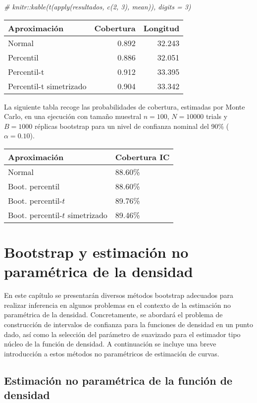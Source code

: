 \documentclass[
]{book}
\newenvironment{Shaded}{\begin{snugshade}}{\end{snugshade}}
\newcommand{\CommentTok}[1]{\textcolor[rgb]{0.56,0.35,0.01}{\textit{#1}}}
\theoremstyle{definition}
\theoremstyle{definition}
\theoremstyle{definition}
\theoremstyle{remark}
\begin{document}
\begin{Shaded}
\begin{Highlighting}[]
\CommentTok{# knitr::kable(t(apply(resultados, c(2, 3), mean)), digits = 3)}
\end{Highlighting}
\end{Shaded}

\begin{longtable}[]{@{}lrr@{}}
\toprule
Aproximación & Cobertura & Longitud\tabularnewline
\midrule
\endhead
Normal & 0.892 & 32.243\tabularnewline
Percentil & 0.886 & 32.051\tabularnewline
Percentil-t & 0.912 & 33.395\tabularnewline
Percentil-t simetrizado & 0.904 & 33.342\tabularnewline
\bottomrule
\end{longtable}

La siguiente tabla recoge las probabilidades de cobertura, estimadas por
Monte Carlo, en una ejecución con tamaño muestral \(n=100\), \(N=10000\)
trials y \(B=1000\) réplicas bootstrap para un nivel de confianza nominal
del 90\% (\(\alpha =0.10\)).

\begin{longtable}[]{@{}ll@{}}
\toprule
Aproximación & Cobertura IC\tabularnewline
\midrule
\endhead
Normal & 88.60\%\tabularnewline
Boot. percentil & 88.60\%\tabularnewline
Boot. percentil-\(t\) & 89.76\%\tabularnewline
Boot. percentil-\(t\) simetrizado & 89.46\%\tabularnewline
\bottomrule
\end{longtable}

\hypertarget{cap6}{%
\chapter{Bootstrap y estimación no paramétrica de la densidad}\label{cap6}}

En este capítulo se presentarán diversos métodos bootstrap adecuados
para realizar inferencia en algunos problemas en el contexto de la
estimación no paramétrica de la densidad. Concretamente, se abordará el
problema de construcción de intervalos de confianza para la funciones de
densidad en un punto dado, así como la selección del parámetro de
suavizado para el estimador tipo núcleo de la función de densidad. A
continuación se incluye una breve introducción a estos métodos no
paramétricos de estimación de curvas.

\hypertarget{estimaciuxf3n-no-paramuxe9trica-de-la-funciuxf3n-de-densidad}{%
\section{Estimación no paramétrica de la función de densidad}\label{estimaciuxf3n-no-paramuxe9trica-de-la-funciuxf3n-de-densidad}}
\end{document}
